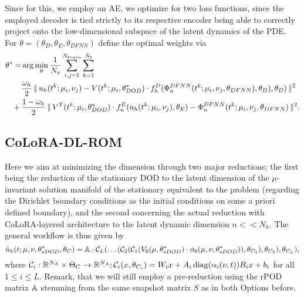 Since for this, we employ an AE, we optimize for two loss functions, since the employed decoder is tied strictly to its respective encoder being able to correctly project onto the low-dimensional subspace of the latent dynamics of the PDE. For $\theta = (\theta_D, \theta_E, \theta_{DFNN})$ define the optimal weights via
\begin{align*}
    \theta^* = &\operatorname{arg}\min_\theta \frac{1}{N_s} \sum_{i, j = 1}^{N_{train}} \sum_{k = 1}^{N_t} \\
    &\frac{\omega_h}{2} \, \lVert \, u_h(t^k; \mu_i, \nu_j) - V(t^k; \mu_i, \theta_{DOD}^*) \cdot f^D_h(\Phi_n^{DFNN}(t^k; \mu_i, \nu_j, \theta_{DFNN}), \theta_D), \theta_{D}) \, \rVert^2 \\
    + \, &\frac{1 - \omega_h}{2} \, \lVert \, V^T(t^k; \mu_i, \theta_{DOD}^*) \cdot f^E_n(u_h(t^k; \mu_i, \nu_j), \theta_E) - \Phi_n^{DFNN}(t^k; \mu_i, \nu_j, \theta_{DFNN}) \, \rVert^2.
\end{align*}

\subsection{CoLoRA-DL-ROM}


Here we aim at minimizing the dimension through two major reductions; the first being the reduction of the stationary DOD to the latent dimension of the $\mu$-invariant solution manifold of the stationary equivalent to the problem (regarding the Dirichlet boundary conditions as the initial conditions on some a priori defined boundary), and the second concerning the actual reduction with CoLoRA-layered architecture to the latent dynamic dimension $n << N_h$. The general workflow is thus given by 
\begin{equation}
    \hat{u}_h(t; \mu, \nu, \theta^*_{sDOD}, \theta_{C}) = \mathbb{A} \cdot \mathcal{C}_L( \dots (\mathcal{C}_2(\mathcal{C}_1(V_0(\mu, \theta^*_{sDOD}) \cdot \phi_0(\mu, \nu, \theta^*_{sDOD})), \theta_{C_1}), \theta_{C_2}), \theta_{C_L}),
\end{equation}
where $\mathcal{C}_i: \mathbb{R}^{N_A} \times \Theta_C \to \mathbb{R}^{N_A}; \mathcal{C}_i(x, \theta_{C_i}) = W_i x + A_i \, \text{diag}(\alpha_i(\nu, t)) B_i x + b_i$ for all $1 \leq i \leq L.$
Remark, that we will still employ a pre-reduction using the rPOD matrix $\mathbb{A}$ stemming from the same snapshot matrix $S$ as in both Options before.

